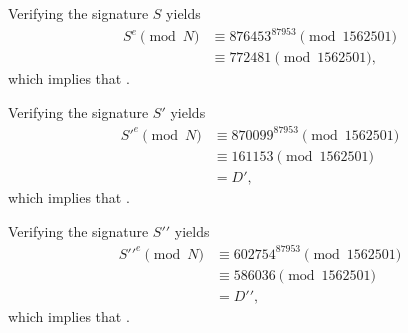 \documentclass[
  coursecode={MTHE 418},
  assignmentname={Homework \homeworknumber},
  studentnumber=20053722,
  name={Bryan Hoang},
  draft,
]{
  ltxanswer%
}
\begin{document}
  \begin{questions}
    \setcounter{question}{\questionnumber}
    \addtocounter{question}{-1}
    \question[10]
    \begin{solution}
      Verifying the signature \(S\) yields
      \begin{align*}
        S^{e} \pmod{N} &\equiv 876453^{87953} \pmod{1562501} \\
                       &\equiv 772481 \pmod{1562501},
      \end{align*}
      which implies that .

      Verifying the signature \(S\prime\) yields
      \begin{align*}
        S\prime^{e} \pmod{N} &\equiv 870099^{87953} \pmod{1562501} \\
                             &\equiv 161153         \pmod{1562501} \\
                             &= D\prime,
      \end{align*}
      which implies that .

      Verifying the signature \(S\prime\prime\) yields
      \begin{align*}
        S\prime\prime^{e} \pmod{N} &\equiv 602754^{87953} \pmod{1562501} \\
                                   &\equiv 586036      \pmod{1562501}    \\
                                   &= D\prime\prime,
      \end{align*}
      which implies that .
    \end{solution}
  \end{questions}
\end{document}
